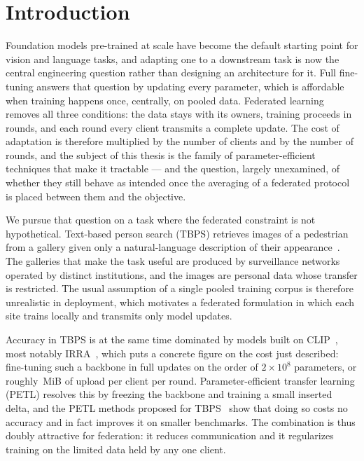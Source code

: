 \section{Introduction}\label{sec:intro}

Foundation models pre-trained at scale have become the default starting point for vision and language tasks, and adapting one to a downstream task is now the central engineering question rather than designing an architecture for it. Full fine-tuning answers that question by updating every parameter, which is affordable when training happens once, centrally, on pooled data. Federated learning~\citep{mcmahan2023communicationefficientlearningdeepnetworks} removes all three conditions: the data stays with its owners, training proceeds in rounds, and each round every client transmits a complete update. The cost of adaptation is therefore multiplied by the number of clients and by the number of rounds, and the subject of this thesis is the family of parameter-efficient techniques that make it tractable --- and the question, largely unexamined, of whether they still behave as intended once the averaging of a federated protocol is placed between them and the objective.

We pursue that question on a task where the federated constraint is not hypothetical. Text-based person search (TBPS) retrieves images of a pedestrian from a gallery given only a natural-language description of their appearance~\citep{li2017personsearchnaturallanguage}. The galleries that make the task useful are produced by surveillance networks operated by distinct institutions, and the images are personal data whose transfer is restricted. The usual assumption of a single pooled training corpus is therefore unrealistic in deployment, which motivates a federated formulation in which each site trains locally and transmits only model updates.

Accuracy in TBPS is at the same time dominated by models built on CLIP~\citep{radford2021learningtransferablevisualmodels}, most notably IRRA~\citep{jiang2023crossmodalimplicitrelationreasoning}, which puts a concrete figure on the cost just described: fine-tuning such a backbone in full updates on the order of $2\times10^{8}$ parameters, or roughly \numUplinkFull\,MiB of upload per client per round. Parameter-efficient transfer learning (PETL) resolves this by freezing the backbone and training a small inserted delta, and the PETL methods proposed for TBPS~\citep{liu2024clipbasedsynergisticknowledgetransfer,liu2025dmadapterdomainawaremixtureofadapterstextbased,liu2025uppersonunifiedparameterefficienttransfer} show that doing so costs no accuracy and in fact improves it on smaller benchmarks. The combination is thus doubly attractive for federation: it reduces communication and it regularizes training on the limited data held by any one client.

